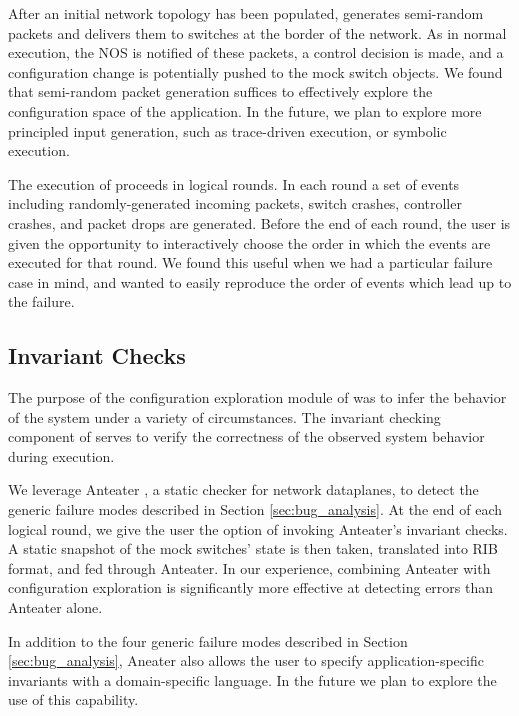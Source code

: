 After an initial network topology has been populated, \projectname{}
generates semi-random packets and delivers them to switches at the border of
the network. As in normal execution, the NOS is notified of these packets, a
control decision is made, and a configuration change is potentially pushed 
to the mock switch objects. We found
that semi-random packet generation suffices to effectively explore the
configuration space of the application. In the future, we plan to explore more
principled input generation, such as trace-driven execution, or symbolic
execution. 

The execution of \projectname{} proceeds in logical rounds. In each round 
a set of events including randomly-generated incoming packets,
switch crashes, controller crashes, and packet drops are generated. Before the end of 
each round, the user is given the opportunity to interactively choose the order
in which the events are executed for that round. We found this useful when we
had a particular failure case in mind, and wanted to easily reproduce the
order of events which lead up to the failure.


\subsection{Invariant Checks}
\label{sec:invariant_checks}

The purpose of the configuration exploration module of \projectname{} was to
infer the behavior of the system under a variety of circumstances. The invariant
checking component of \projectname{} serves to verify the correctness of the
observed system behavior during execution.

We leverage Anteater \cite{anteater}, a static checker for network
dataplanes, to detect the generic failure modes described in Section \ref{sec:bug_analysis}.
At the end of each logical round, we give the user the option of invoking
Anteater's invariant checks. A static snapshot of the mock switches' state is
then taken, translated into RIB format, and fed through Anteater. In our
experience, combining Anteater with configuration exploration is significantly
more effective at detecting errors than Anteater alone.

In addition to the four generic failure modes described in Section
\ref{sec:bug_analysis}, Aneater also allows the user to specify
application-specific invariants with a domain-specific language. In the future
we plan to explore the use of this capability.

